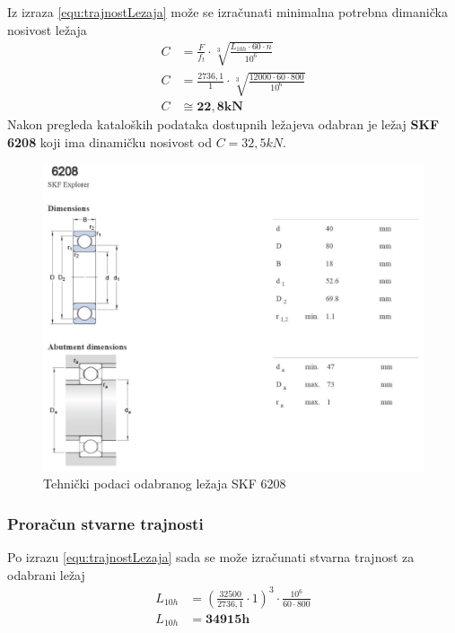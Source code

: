 \documentclass[12pt,a4paper]{article}
\begin{document}
Iz izraza \eqref{equ:trajnostLezaja} može se izračunati minimalna potrebna dimanička nosivost ležaja
\begin{align*}
C&=\frac{F}{f_t} \cdot \sqrt[3]{\frac{L_{10h} \cdot 60 \cdot n}{10^6}}\\
C&=\frac{2736,1}{1} \cdot \sqrt[3]{\frac{12000 \cdot 60 \cdot 800}{10^6}}\\
C&\cong \mathbf{22,8kN}
\end{align*}
Nakon pregleda kataloških podataka dostupnih ležajeva odabran je ležaj \textbf{SKF 6208} koji ima dinamičku nosivost od $C=32,5kN$.

\begin{figure}[!h]
\centering
\includegraphics[width=1\textwidth]{6208_data}
\caption{Tehnički podaci odabranog ležaja SKF 6208}\label{6208data}
\end{figure}

\subsubsection*{Proračun stvarne trajnosti}
Po izrazu \eqref{equ:trajnostLezaja} sada se može izračunati stvarna trajnost za odabrani ležaj
\begin{align*}
L_{10h}&=\left(\frac{32500}{2736,1} \cdot 1 \right)^3 \cdot \frac{10^6}{60 \cdot 800}\\
L_{10h}&=\mathbf{34915 h}
\end{align*}

\newpage
\end{document}
